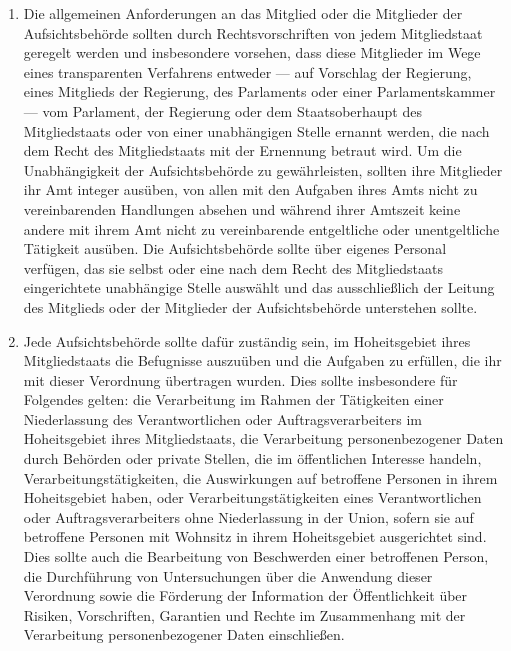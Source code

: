 \begin{enumerate}
   \item Die allgemeinen Anforderungen an das Mitglied oder die Mitglieder der Aufsichtsbehörde sollten durch
    Rechtsvorschriften von jedem Mitgliedstaat geregelt werden und insbesondere vorsehen, dass diese Mitglieder im Wege
    eines transparenten Verfahrens entweder — auf Vorschlag der Regierung, eines Mitglieds der Regierung, des
    Parlaments oder einer Parlamentskammer — vom Parlament, der Regierung oder dem Staatsoberhaupt des Mitgliedstaats
    oder von einer unabhängigen Stelle ernannt werden, die nach dem Recht des Mitgliedstaats mit der Ernennung betraut
    wird. Um die Unabhängigkeit der Aufsichtsbehörde zu gewährleisten, sollten ihre Mitglieder ihr Amt integer ausüben,
    von allen mit den Aufgaben ihres Amts nicht zu vereinbarenden Handlungen absehen und während ihrer Amtszeit keine
    andere mit ihrem Amt nicht zu vereinbarende entgeltliche oder unentgeltliche Tätigkeit ausüben. Die
    Aufsichtsbehörde sollte über eigenes Personal verfügen, das sie selbst oder eine nach dem Recht des Mitgliedstaats
    eingerichtete unabhängige Stelle auswählt und das ausschließlich der Leitung des Mitglieds oder der Mitglieder der
    Aufsichtsbehörde unterstehen sollte.%
   \label{itm:eg-121}
   

   \item Jede Aufsichtsbehörde sollte dafür zuständig sein, im Hoheitsgebiet ihres Mitgliedstaats die Befugnisse
    auszuüben und die Aufgaben zu erfüllen, die ihr mit dieser Verordnung übertragen wurden. Dies sollte insbesondere
    für Folgendes gelten: die Verarbeitung im Rahmen der Tätigkeiten einer Niederlassung des Verantwortlichen oder
    Auftragsverarbeiters im Hoheitsgebiet ihres Mitgliedstaats, die Verarbeitung personenbezogener Daten durch Behörden
    oder private Stellen, die im öffentlichen Interesse handeln, Verarbeitungstätigkeiten, die Auswirkungen auf
    betroffene Personen in ihrem Hoheitsgebiet haben, oder Verarbeitungstätigkeiten eines Verantwortlichen oder
    Auftragsverarbeiters ohne Niederlassung in der Union, sofern sie auf betroffene Personen mit Wohnsitz in ihrem
    Hoheitsgebiet ausgerichtet sind. Dies sollte auch die Bearbeitung von Beschwerden einer betroffenen Person, die
    Durchführung von Untersuchungen über die Anwendung dieser Verordnung sowie die Förderung der Information der
    Öffentlichkeit über Risiken, Vorschriften, Garantien und Rechte im Zusammenhang mit der Verarbeitung
    personenbezogener Daten einschließen.%
   \label{itm:eg-122}
   

\end{enumerate}
